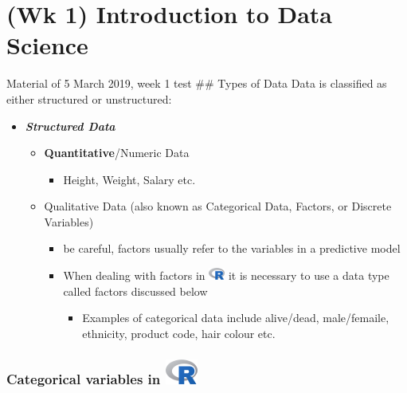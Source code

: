 \documentclass[]{book}
\providecommand{\tightlist}{%
  \setlength{\itemsep}{0pt}\setlength{\parskip}{0pt}}
\begin{document}
\chapter{(Wk 1) Introduction to Data
Science}\label{wk-1-introduction-to-data-science}

Material of 5 March 2019, week 1 test \#\# Types of Data Data is
classified as either structured or unstructured:

\begin{itemize}
\tightlist
\item
  \textbf{\emph{Structured Data}}

  \begin{itemize}
  \tightlist
  \item
    \textbf{Quantitative}/Numeric Data

    \begin{itemize}
    \tightlist
    \item
      Height, Weight, Salary etc.
    \end{itemize}
  \item
    Qualitative Data (also known as Categorical Data, Factors, or
    Discrete Variables)

    \begin{itemize}
    \tightlist
    \item
      be careful, factors usually refer to the variables in a predictive
      model
    \item
      When dealing with factors in
      \includegraphics{./images/Ricon20px.png} it is necessary to use a
      data type called factors discussed below

      \begin{itemize}
      \tightlist
      \item
        Examples of categorical data include alive/dead, male/femaile,
        ethnicity, product code, hair colour etc.
      \end{itemize}
    \end{itemize}
  \end{itemize}
\end{itemize}

\subsection[Categorical variables in ]{\texorpdfstring{Categorical
variables in
\protect\includegraphics{images/Ricon40px.png}}{Categorical variables in }}\label{categorical-variables-in}
\end{document}
